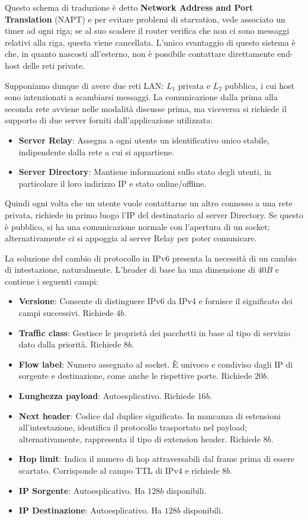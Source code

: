 \noindent Questo schema di traduzione è detto \textbf{Network Address and Port Translation} (NAPT) e per evitare problemi di starvation, vede associato
un timer ad ogni riga; se al suo scadere il router verifica che non ci sono messaggi relativi alla riga, questa viene cancellata. L'unico svantaggio
di questo sistema è che, in quanto nascosti all'esterno, non è possibile contattare direttamente end-host delle reti private.\par
Supponiamo dunque di avere due reti LAN: $L_1$ privata e $L_2$ pubblica, i cui host sono intenzionati a scambiarsi messaggi. La comunicazione dalla
prima alla seconda rete avviene nelle modalità discusse prima, ma viceversa si richiede il supporto di due server forniti dall'applicazione utilizzata:
\begin{itemize}
	\item \textbf{Server Relay}: Assegna a ogni utente un identificativo unico stabile, indipendente dalla rete a cui si appartiene.
	\item \textbf{Server Directory}: Mantiene informazioni sullo stato degli utenti, in particolare il loro indirizzo IP e stato online/offline.
\end{itemize}

\noindent Quindi ogni volta che un utente vuole contattarne un altro connesso a una rete privata, richiede in primo luogo l'IP del destinatario al
server Directory. Se questo è pubblico, si ha una comunicazione normale con l'apertura di un socket; alternativamente ci si appoggia al server Relay
per poter comunicare.\par
La soluzione del cambio di protocollo in IPv6 presenta la necessità di un cambio di intestazione, naturalmente. L'header di base ha una dimensione di
$40B$ e contiene i seguenti campi: \begin{itemize}
	\item \textbf{Versione}: Consente di distinguere IPv6 da IPv4 e fornisce il significato dei campi successivi. Richiede $4b$.
	\item \textbf{Traffic class}: Gestisce le proprietà dei pacchetti in base al tipo di servizio dato dalla priorità. Richiede $8b$.
	\item \textbf{Flow label}: Numero assegnato al socket. È univoco e condiviso dagli IP di sorgente e destinazione, come anche le rispettive porte.
	Richiede $20b$.
	\item \textbf{Lunghezza payload}: Autoesplicativo. Richiede $16b$.
	\item \textbf{Next header}: Codice dal duplice significato. In mancanza di estensioni all'intestazione, identifica il protocollo trasportato nel
	payload; alternativamente, rappresenta il tipo di extension header. Richiede $8b$.
	\item \textbf{Hop limit}: Indica il numero di hop attraversabili dal frame prima di essere scartato. Corrisponde al campo TTL di IPv4 e richiede
	$8b$.
	\item \textbf{IP Sorgente}: Autoesplicativo. Ha $128b$ disponibili.
	\item \textbf{IP Destinazione}: Autoesplicativo. Ha $128b$ disponibili.
\end{itemize}

